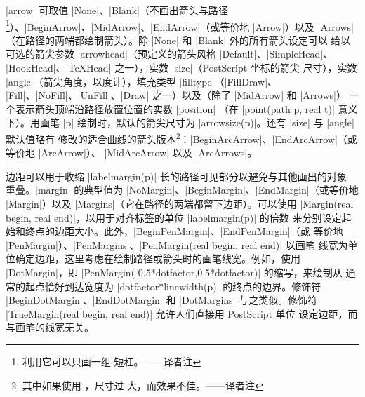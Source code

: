 \documentclass[nofonts,CJKnormalspaces]{ctexbook}[2009/05/20]
\newcommand*\prgname[1]{\textsf{#1}}
\newcommand\transnote[1]{\footnote{#1——译者注}}
\begin{document}
|arrow| 可取值 |None|、|Blank|（不画出箭头与路径\transnote{利用它可以只画一组
短杠。}）、|BeginArrow|、|MidArrow|、|EndArrow|（或等价地 |Arrow|）以及
|Arrows|（在路径的两端都绘制箭头）。除 |None| 和 |Blank| 外的所有箭头设定可以
给以可选的箭尖参数 |arrowhead|（预定义的箭头风格 |Default|、|SimpleHead|、
|HookHead|、|TeXHead| 之一），实数 |size|（\prgname{PostScript} 坐标的箭尖
尺寸），实数 |angle|（箭尖角度，以度计），填充类型 |filltype|（|FillDraw|、
|Fill|、|NoFill|、|UnFill|、|Draw| 之一）以及（除了 |MidArrow| 和 |Arrows|）
一个表示箭头顶端沿路径放置位置的实数 |position|
（在 |point(path p, real t)| 意义下）。用画笔 |p|
绘制时，默认的箭尖尺寸为 |arrowsize(p)|。还有 |size| 与 |angle| 默认值略有
修改的适合曲线的箭头版本\transnote{其中如果使用 ，尺寸过
大，而效果不佳。}：|BeginArcArrow|、|EndArcArrow|（或等价地 |ArcArrow|）、
|MidArcArrow| 以及 |ArcArrows|。

边距可以用于收缩 |labelmargin(p)| 长的路径可见部分以避免与其他画出的对象
重叠。|margin| 的典型值为 |NoMargin|、|BeginMargin|、|EndMargin|（或等价地
|Margin|）以及 |Margins|（它在路径的两端都留下边距）。可以使用
|Margin(real begin, real end)|，以用于对齐标签的单位 |labelmargin(p)| 的倍数
来分别设定起始和终点的边距大小。此外，|BeginPenMargin|、|EndPenMargin|（或
等价地 |PenMargin|）、|PenMargins|、|PenMargin(real begin, real end)| 以画笔
线宽为单位确定边距，这里考虑在绘制路径或箭头时的画笔线宽。例如，使用
|DotMargin|，即 |PenMargin(-0.5*dotfactor,0.5*dotfactor)| 的缩写，来绘制从
通常的起点恰好到达宽度为 |dotfactor*linewidth(p)| 的终点的边界。修饰符
|BeginDotMargin|、|EndDotMargin| 和 |DotMargins| 与之类似。修饰符
|TrueMargin(real begin, real end)| 允许人们直接用 \prgname{PostScript} 单位
设定边距，而与画笔的线宽无关。
\end{document}
